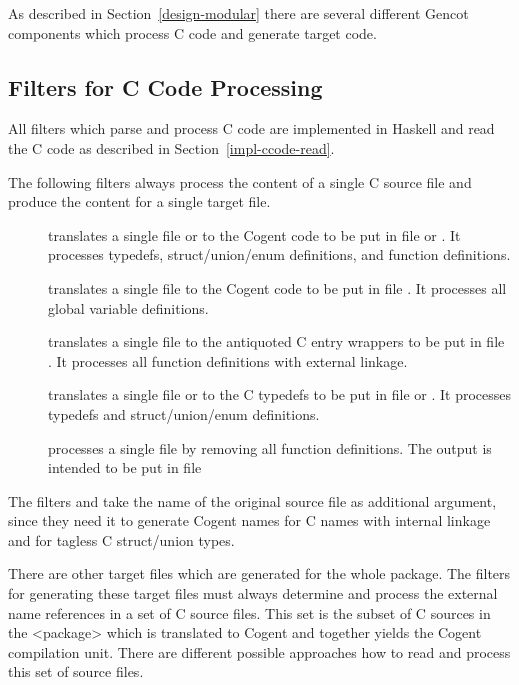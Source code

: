 As described in Section~\ref{design-modular} there are several different Gencot components which process C code and generate 
target code.

\subsection{Filters for C Code Processing}
\label{impl-comps-filters}

All filters which parse and process C code are implemented in Haskell and read the
C code as described in Section~\ref{impl-ccode-read}.

The following filters always process the content of a single C source file and produce the content for a single 
target file.
\begin{description}
\item[] translates a single file  or  to the Cogent code to be put in file
 or . It processes typedefs, struct/union/enum definitions, and function
definitions. 
\item[] translates a single file  to the Cogent code to be put in file .
It processes all global variable definitions.
\item[] translates a single file  to the antiquoted C entry wrappers to be put in
file . It processes all function definitions with external linkage.
\item[] translates a single file  or  to the C typedefs to be put in
file  or . It processes typedefs and struct/union/enum definitions.
\item[] processes a single file  by removing all function definitions. The output
is intended to be put in file 
\end{description}

The filters  and  take the name of the original source file as additional
argument, since they need it to generate Cogent names for C names with internal linkage and for tagless C struct/union
types.

There are other target files which are generated for the whole package. The filters for generating these target files 
must always determine and process the external name references in a set of
C source files. This set is the subset of C sources in the <package> which is translated to Cogent and together yields
the Cogent compilation unit. There are different possible approaches how to read and process this set of source files.

